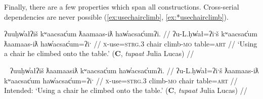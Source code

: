 Finally, there are a few properties which span all constructions. Cross-serial dependencies are never possible (\ref{ex:usechairclimb}, \ref{ex:*usechairclimb}).

\ex \label{ex:usechairclimb}
\begingl
\glpreamble ʔuuḥw̓ałʔiš kʷaacsac̓um ƛaamaas-iƛ haw̓acsac̓umʔi. //
\gla ʔu-L.ḥw̓ał=ʔiˑš kʷaacsac̓um ƛaamaas-iƛ haw̓acsac̓um=ʔiˑ //
\glb \textsc{x}-use=\textsc{strg.3} chair climb-\textsc{mo} table=\textsc{art} //
\glft `Using a chair he climbed onto the table.' (\textbf{C}, \textit{tupaat} Julia Lucas) //
\endgl
\xe

\ex~ \label{ex:*usechairclimb}
\begingl
\glpreamble *ʔuuḥw̓ałʔiš ƛaamaasiƛ kʷaacsac̓um haw̓acsac̓umʔi. //
\gla ʔu-L.ḥw̓ał=ʔiˑš ƛaamaas-iƛ kʷaacsac̓um haw̓acsac̓um=ʔiˑ //
\glb \textsc{x}-use=\textsc{strg.3} climb-\textsc{mo} chair table=\textsc{art} //
\glft Intended: `Using a chair he climbed onto the table.' (\textbf{C}, \textit{tupaat} Julia Lucas) //
\endgl
\xe






\begin{comment}
Something similar happened with Sophie Billy. Sentence () is from a translation text she has been working on, and I asked about rephrases () and (). While I was interpreting () as manner and action (Type I), I think she, in the context of the story, saw them as sequential (Type V): lead and then bring back. In this context, the reordering of () is nonsense: One cannot bring someone back and then lead them.

\ex \label{ex:leadbringback}
\begingl
\glpreamble m̓aw̓aaƛint ḥaaw̓iłƛisi huʔacap̓ƛ. //
\gla m̓aw̓aa=!aƛ=int ḥaaw̓iłƛ=ʔis=ʔiˑ huʔa-ci-!ap=!aƛ //
\glb lead=\textsc{now}=\textsc{pst} young.man=\textsc{dimin}=\textsc{art} back-go=\textsc{caus}\textsc{now} //
\glft `She led the young man and took him back.' (\textbf{Q}, Sophie Billy) //
\endgl
\xe

NB: This is due to obj-verb ordering of ex. 3
BM
yaacukw̓it̓asaḥ waałak c̓uumaʕas
*yaacukw̓it̓asaḥ c̓uumaʕas
*yaacukw̓it̓asaḥ c̓uumaʕas waałak


NB: This may be due to the !aƛ forcing a two-sentence interpretation
SB
m̓aw̓aaƛint ḥaaw̓iłƛisi huʔacap̓ƛ
m̓aw̓aaƛint huʔacap̓ƛ ḥaaw̓iłƛisi
*huʔacap̓ƛint m̓aw̓aaƛ ḥaaw̓iłƛisi 
\end{comment}

